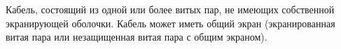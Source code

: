 Кабель, состоящий из одной или более витых пар, не имеющих
собственной экранирующей оболочки. Кабель может иметь 
общий экран (экранированная витая пара или незащищенная 
витая пара с общим экраном).